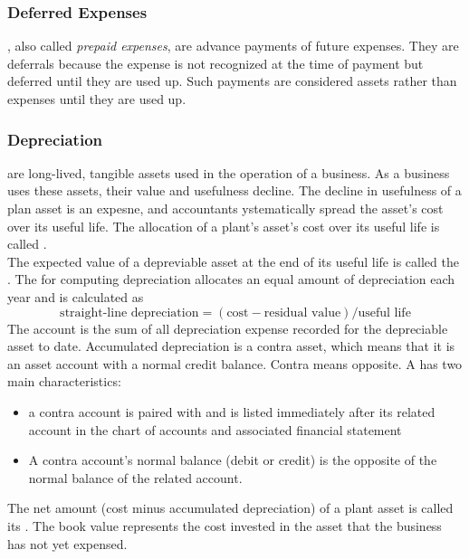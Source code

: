 \documentclass{article}
\begin{document}
\subsubsection{Deferred Expenses}

, also called \emph{prepaid expenses}, are advance payments of future expenses. They are deferrals because the expense is not recognized at the time of payment but deferred until they are used up. Such payments are considered assets rather than expenses until they are used up. 

\subsubsection{Depreciation}

 are long-lived, tangible assets used in the operation of a business. As a business uses these assets, their value and usefulness decline. The decline in usefulness of a plan asset is an expesne, and accountants ystematically spread the asset's cost over its useful life. The allocation of a plant's asset's cost over its useful life is called . \\ 

The expected value of a depreviable asset at the end of its useful life is called the . The  for computing depreciation allocates an equal amount of depreciation each year and is calculated as $$\textrm{straight-line depreciation} = (\textrm{cost} - \textrm{residual value}) / \textrm{useful life}$$ The  account is the sum of all depreciation expense recorded for the depreciable asset to date. Accumulated depreciation is a contra asset, which means that it is an asset account with a normal credit balance. Contra means opposite. A  has two main characteristics: 
\begin{itemize}
  \item a contra account is paired with and is listed immediately after its related account in the chart of accounts and associated financial statement 
  \item A contra account's normal balance (debit or credit) is the opposite of the normal balance of the related account. 
\end{itemize}
The net amount (cost minus accumulated depreciation) of a plant asset is called its . The book value represents the cost invested in the asset that the business has not yet expensed. 
\end{document}
